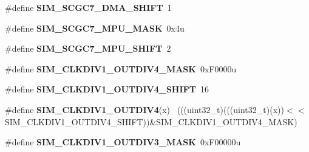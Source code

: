 \begin{DoxyCompactItemize}
\item 
\hypertarget{group___s_i_m___register___masks_ga1113f1622eb2e4099653e93943a89c6e}{}\#define {\bfseries S\+I\+M\+\_\+\+S\+C\+G\+C7\+\_\+\+D\+M\+A\+\_\+\+S\+H\+I\+F\+T}~1\label{group___s_i_m___register___masks_ga1113f1622eb2e4099653e93943a89c6e}

\item 
\hypertarget{group___s_i_m___register___masks_ga10319f9b82c284e2b8c0dbe633a8cc47}{}\#define {\bfseries S\+I\+M\+\_\+\+S\+C\+G\+C7\+\_\+\+M\+P\+U\+\_\+\+M\+A\+S\+K}~0x4u\label{group___s_i_m___register___masks_ga10319f9b82c284e2b8c0dbe633a8cc47}

\item 
\hypertarget{group___s_i_m___register___masks_ga6e29c9922d73e340397f527f22dccd97}{}\#define {\bfseries S\+I\+M\+\_\+\+S\+C\+G\+C7\+\_\+\+M\+P\+U\+\_\+\+S\+H\+I\+F\+T}~2\label{group___s_i_m___register___masks_ga6e29c9922d73e340397f527f22dccd97}

\item 
\hypertarget{group___s_i_m___register___masks_gaa2a972171bb5a662e1b4993b042f7180}{}\#define {\bfseries S\+I\+M\+\_\+\+C\+L\+K\+D\+I\+V1\+\_\+\+O\+U\+T\+D\+I\+V4\+\_\+\+M\+A\+S\+K}~0x\+F0000u\label{group___s_i_m___register___masks_gaa2a972171bb5a662e1b4993b042f7180}

\item 
\hypertarget{group___s_i_m___register___masks_ga053a7a1ffc9f3b6834679c63ca0ebe29}{}\#define {\bfseries S\+I\+M\+\_\+\+C\+L\+K\+D\+I\+V1\+\_\+\+O\+U\+T\+D\+I\+V4\+\_\+\+S\+H\+I\+F\+T}~16\label{group___s_i_m___register___masks_ga053a7a1ffc9f3b6834679c63ca0ebe29}

\item 
\hypertarget{group___s_i_m___register___masks_ga1c33604ada20447d39b21e0f39c9dcd0}{}\#define {\bfseries S\+I\+M\+\_\+\+C\+L\+K\+D\+I\+V1\+\_\+\+O\+U\+T\+D\+I\+V4}(x)                                  ~(((uint32\+\_\+t)(((uint32\+\_\+t)(x))$<$$<$S\+I\+M\+\_\+\+C\+L\+K\+D\+I\+V1\+\_\+\+O\+U\+T\+D\+I\+V4\+\_\+\+S\+H\+I\+F\+T))\&S\+I\+M\+\_\+\+C\+L\+K\+D\+I\+V1\+\_\+\+O\+U\+T\+D\+I\+V4\+\_\+\+M\+A\+S\+K)\label{group___s_i_m___register___masks_ga1c33604ada20447d39b21e0f39c9dcd0}

\item 
\hypertarget{group___s_i_m___register___masks_ga0a017e7ea9a2d31e9b23aa2cab06c19d}{}\#define {\bfseries S\+I\+M\+\_\+\+C\+L\+K\+D\+I\+V1\+\_\+\+O\+U\+T\+D\+I\+V3\+\_\+\+M\+A\+S\+K}~0x\+F00000u\label{group___s_i_m___register___masks_ga0a017e7ea9a2d31e9b23aa2cab06c19d}


\end{DoxyCompactItemize}
